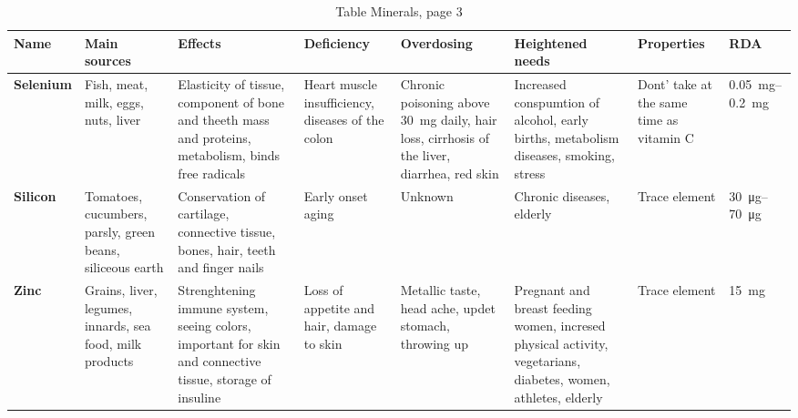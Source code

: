 \documentclass[../main.tex]{subfiles}
\begin{document}
\begin{sidewaystable}[p!]
  \caption{Table Minerals, page 3}
  \centering
  \begin{small}
  \begin{tabularx}{\textwidth}{p{1.2cm}p{2.5cm}p{3cm}p{3cm}p{2.3cm}p{2.5cm}p{3cm}p{1cm}}
    \toprule 
    \textbf{Name} &\textbf{Main sources} & \textbf{Effects} &\textbf{Deficiency} & \textbf{Overdosing} & \textbf{Heightened needs} & \textbf{Properties} & \textbf{RDA} \\
    \midrule
    \textbf{Sele\-ni\-um}\index{mineral!selenium} &
    Fish, meat, milk, eggs, nuts, liver &
    Elasticity of tissue, component of bone and theeth mass and proteins, metabolism, binds free radicals &
    Heart muscle insufficiency, diseases of the colon & Chronic poisoning above \SI{30}{\mg} daily, hair loss, cirrhosis of the liver, diarrhea, red skin &
    Increased conspumtion of alcohol, early births, metabolism diseases, smoking, stress &
    Dont' take at the same time as vitamin C &
    \SIrange{0.05}{0.2}{\mg} \\
    \textbf{Si\-li\-con}\index{mineral!silicon} &
    Tomatoes, cucumbers, parsly, green beans, siliceous earth &
    Conservation of cartilage, connective tissue, bones, hair, teeth and finger nails &
    Early onset aging &
    Unknown &
    Chronic diseases, elderly &
    Trace element &
    \SIrange{30}{70}{\micro\gram} \\
    \textbf{Zinc}\index{mineral!zinc} &
    Grains, liver, legumes, innards, sea food, milk products &
    Strenghtening immune system, seeing colors, important for skin and connective tissue, storage of insuline &
    Loss of appetite and hair, damage to skin &
    Metallic taste, head ache, updet stomach, throwing up &
    Pregnant and breast feeding women, incresed physical activity, vegetarians, diabetes, women, athletes, elderly &
    Trace element &
    \SI{15}{\mg}  \\
    \bottomrule
  \end{tabularx}
  \end{small}
  \end{sidewaystable}
\end{document}
